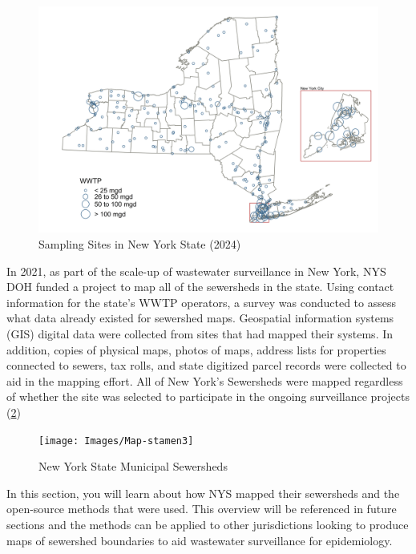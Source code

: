 \documentclass[
]{book}
\begin{document}
\begin{figure}

{\centering \includegraphics[width=150in]{Images/Participating_staticmap_2022_v2} 

}

\caption{Sampling Sites in New York State (2024)}\label{fig:fig1}
\end{figure}

In 2021, as part of the scale-up of wastewater surveillance in New York, NYS DOH funded a project to map all of the sewersheds in the state. Using contact information for the state's WWTP operators, a survey was conducted to assess what data already existed for sewershed maps. Geospatial information systems (GIS) digital data were collected from sites that had mapped their systems. In addition, copies of physical maps, photos of maps, address lists for properties connected to sewers, tax rolls, and state digitized parcel records were collected to aid in the mapping effort. All of New York's Sewersheds were mapped regardless of whether the site was selected to participate in the ongoing surveillance projects (\ref{fig:fig2})

\begin{figure}

{\centering \texttt{[image: Images/Map-stamen3]} 

}

\caption{New York State Municipal Sewersheds}\label{fig:fig2}
\end{figure}

In this section, you will learn about how NYS mapped their sewersheds and the open-source methods that were used. This overview will be referenced in future sections and the methods can be applied to other jurisdictions looking to produce maps of sewershed boundaries to aid wastewater surveillance for epidemiology.
\end{document}
